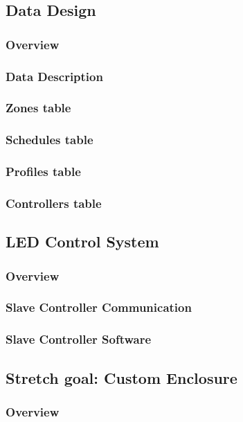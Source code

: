\documentclass[onecolumn, draftclsnofoot,10pt, compsoc]{IEEEtran}
\begin{document}
		\subsection{Data Design}
			\subsubsection{Overview}
			\subsubsection{Data Description}
			\subsubsection{Zones table}
			\subsubsection{Schedules table}
			\subsubsection{Profiles table}
			\subsubsection{Controllers table}

		\subsection{LED Control System}
			\subsubsection{Overview}
			\subsubsection{Slave Controller Communication}
			\subsubsection{Slave Controller Software}

		\subsection{Stretch goal: Custom Enclosure}
			\subsubsection{Overview}
\end{document}
